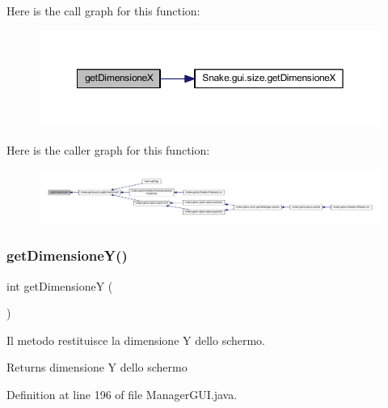 Here is the call graph for this function\+:
\nopagebreak
\begin{figure}[H]
\begin{center}
\leavevmode
\includegraphics[width=350pt]{class_snake_1_1gui_1_1_manager_g_u_i_a9e8362afc9e8ce68cca6528eb57869a2_cgraph}
\end{center}
\end{figure}
Here is the caller graph for this function\+:
\nopagebreak
\begin{figure}[H]
\begin{center}
\leavevmode
\includegraphics[width=350pt]{class_snake_1_1gui_1_1_manager_g_u_i_a9e8362afc9e8ce68cca6528eb57869a2_icgraph}
\end{center}
\end{figure}
\mbox{\label{class_snake_1_1gui_1_1_manager_g_u_i_a2bb8f24fa464bafa5b480a95b8b738a8}} 
\subsubsection{\texorpdfstring{get\+Dimensione\+Y()}{getDimensioneY()}}
{\footnotesize\ttfamily int get\+DimensioneY (\begin{DoxyParamCaption}{ }\end{DoxyParamCaption})}



Il metodo restituisce la dimensione Y dello schermo. 

\begin{DoxyReturn}{Returns}
dimensione Y dello schermo 
\end{DoxyReturn}


Definition at line 196 of file Manager\+G\+U\+I.\+java.

